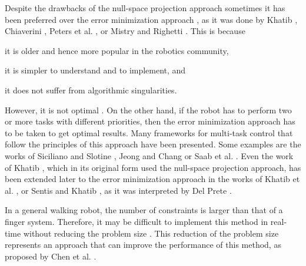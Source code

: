 	Despite the drawbacks of the null-space projection approach sometimes it has been preferred
	over the error minimization approach \cite{DelPrete_PhDThesis2013}, as it was done by
	Khatib	\cite{Khatib_IJRR1995}, Chiaverini \cite{Chiaverini_RoboticsAuto1997},
	Peters et al. \cite{Peters_AutoRobots2008}, or Mistry and Righetti \cite{Mistry_RSS2011}. 
	This is because
	\begin{inparaenum}
		\item it is older and hence more popular in the robotics community,
		\item it is simpler to understand and to implement, and
		\item it does not suffer from algorithmic singularities.
	\end{inparaenum}
	However, it is not optimal \cite{DelPrete_PhDThesis2013}.
	On the other hand, if the robot has to perform two or more tasks with different priorities,
	then the error minimization approach has to be taken to get optimal results.
	Many frameworks for multi-task control that follow the principles of this approach have been
	presented.
	Some examples are the works of Siciliano and Slotine \cite{Siciliano_AdvRobotics1991},
	Jeong and Chang \cite{Jeong_IROS2009} or Saab et al. \cite{Saab_ICRA2011}.
	Even the work of Khatib	\cite{Khatib_IJRR1995}, which in its original form used the null-space
	projection approach, has been extended later to the error minimization approach in the works
	of Khatib et al. \cite{Khatib_IJHR2004}, or Sentis and Khatib \cite{Sentis_ICRA2006}, as it
	was interpreted by Del Prete \cite{DelPrete_PhDThesis2013}.
		
	In a general walking robot, the number of constraints is larger than that of a finger system.
	Therefore, it may be difficult to implement this method in real-time without reducing the
	problem size \cite{Kwon_IntellRobotSys1998}.
	This reduction of the problem size represents an approach that can improve the performance
	of this method, as proposed by Chen et al. \cite{Chen_MIRC1999}.
	
